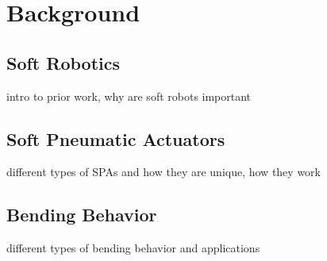 \chapter{Background}
\section{Soft Robotics}
intro to prior work, why are soft robots important
\section{Soft Pneumatic Actuators}
different types of SPAs and how they are unique, how they work
\section{Bending Behavior}
different types of bending behavior and applications